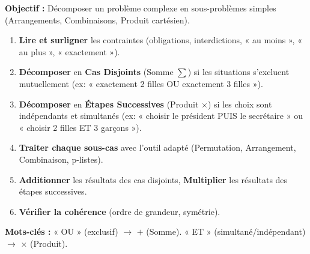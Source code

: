 \documentclass[11pt]{article}
\begin{document}
\begin{methode}
\textbf{Objectif :} Décomposer un problème complexe en sous-problèmes simples (Arrangements, Combinaisons, Produit cartésien).
\begin{enumerate}
    \item \textbf{Lire et surligner} les contraintes (obligations, interdictions, « au moins », « au plus », « exactement »).
    \item \textbf{Décomposer} en \textbf{Cas Disjoints} (Somme $\sum$) si les situations s'excluent mutuellement (ex: « exactement 2 filles OU exactement 3 filles »).
    \item \textbf{Décomposer} en \textbf{Étapes Successives} (Produit $\times$) si les choix sont indépendants et simultanés (ex: « choisir le président PUIS le secrétaire » ou « choisir 2 filles ET 3 garçons »).
    \item \textbf{Traiter chaque sous-cas} avec l'outil adapté (Permutation, Arrangement, Combinaison, p-listes).
    \item \textbf{Additionner} les résultats des cas disjoints, \textbf{Multiplier} les résultats des étapes successives.
    \item \textbf{Vérifier la cohérence} (ordre de grandeur, symétrie).
\end{enumerate}
\textbf{Mots-clés :} « OU » (exclusif) $\rightarrow$ $+$ (Somme). « ET » (simultané/indépendant) $\rightarrow$ $\times$ (Produit).
\end{methode}
\end{document}
